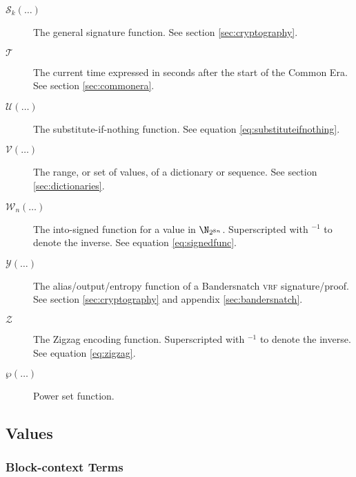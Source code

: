 \begin{description}
  \item[$\mathcal{S}_k(\dots)$] The general signature function. See section \ref{sec:cryptography}.
  \item[$\mathcal{T}$] The current time expressed in seconds after the start of the \Jam Common Era. See section \ref{sec:commonera}.
  \item[$\mathcal{U}(\dots)$] The substitute-if-nothing function. See equation \ref{eq:substituteifnothing}.
  \item[$\mathcal{V}(\dots)$] The range, or set of values, of a dictionary or sequence. See section \ref{sec:dictionaries}.
  \item[$\mathcal{W}_n(\dots)$] The into-signed function for a value in $\N_{2^{8n}}$. Superscripted with ${}^{-1}$ to denote the inverse. See equation \ref{eq:signedfunc}.
  \item[$\mathcal{Y}(\dots)$] The alias/output/entropy function of a Bandersnatch \textsc{vrf} signature/proof. See section \ref{sec:cryptography} and appendix \ref{sec:bandersnatch}.
  \item[$\mathcal{Z}$] The Zigzag encoding function. Superscripted with ${}^{-1}$ to denote the inverse. See equation \ref{eq:zigzag}.
  \item[$\wp(\dots)$] Power set function.
\end{description}

\subsection{Values}

\subsubsection{Block-context Terms}


